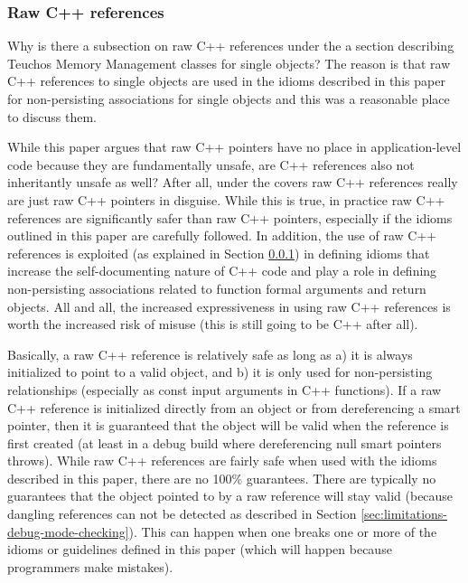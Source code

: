 \documentclass[pdf,ps2pdf,11pt]{SANDreport}
\begin{document}
%
{}\subsubsection{Raw C++ references}
\label{sec:raw-C++-references}
%

Why is there a subsection on raw C++ references under the a section describing
Teuchos Memory Management classes for single objects?  The reason is that raw
C++ references to single objects are used in the idioms described in this
paper for non-persisting associations for single objects and this was a
reasonable place to discuss them.

While this paper argues that raw C++ pointers have no place in
application-level code because they are fundamentally unsafe, are C++
references also not inheritantly unsafe as well?  After all, under the covers
raw C++ references really are just raw C++ pointers in disguise.  While this
is true, in practice raw C++ references are significantly safer than raw C++
pointers, especially if the idioms outlined in this paper are carefully
followed.  In addition, the use of raw C++ references is exploited (as
explained in Section {}\ref{sec:raw-C++-references}) in defining idioms that
increase the self-documenting nature of C++ code and play a role in defining
non-persisting associations related to function formal arguments and return
objects.  All and all, the increased expressiveness in using raw C++
references is worth the increased risk of misuse (this is still going to be
C++ after all).

Basically, a raw C++ reference is relatively safe as long as a) it is always
initialized to point to a valid object, and b) it is only used for
non-persisting relationships (especially as const input arguments in C++
functions).  If a raw C++ reference is initialized directly from an object or
from dereferencing a smart pointer, then it is guaranteed that the object will
be valid when the reference is first created (at least in a debug build where
dereferencing null smart pointers throws).  While raw C++ references are
fairly safe when used with the idioms described in this paper, there are no
100\% guarantees.  There are typically no guarantees that the object pointed
to by a raw reference will stay valid (because dangling references can not be
detected as described in Section {}\ref{sec:limitations-debug-mode-checking}).
This can happen when one breaks one or more of the idioms or guidelines
defined in this paper (which will happen because programmers make mistakes).
\end{document}
